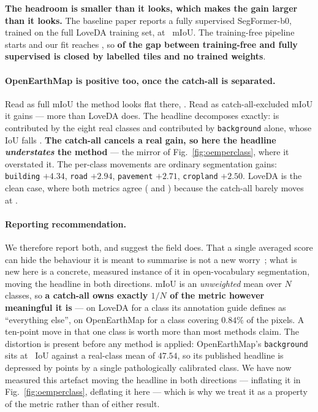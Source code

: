 \documentclass[10pt,a4paper]{article}                        %
\newcommand{\best}[1]{\textbf{#1}}
\newcommand{\bg}{\texttt{background}}
\begin{document}
\best{The headroom is smaller than it looks, which makes the gain larger than it
looks.} The baseline paper reports a fully supervised SegFormer-b0, trained on the
full LoveDA training set, at \oracleSup{}~mIoU. The training-free pipeline starts
\loveInstr{} and our fit reaches \eeFit{}, so \best{\gapClosed{} of the gap between
training-free and fully supervised is closed by \calibTiles{} labelled tiles and no
trained weights}.

\paragraph{OpenEarthMap is positive too, once the catch-all is separated.} Read
as full mIoU the method looks flat there, \mrOemFull{}. Read as
catch-all-excluded mIoU it gains \best{\mrOemReal{}} --- more than LoveDA does.
The headline decomposes exactly: \mrOemFull{} is \mrOemLand{} contributed by the
eight real classes and \mrOemBgC{} contributed by \bg{} alone, whose IoU falls
\mrOemBg{}. \best{The catch-all cancels a real gain, so here the headline
\emph{understates} the method} --- the mirror of Fig.~\ref{fig:oemperclass},
where it overstated it. The per-class movements are ordinary segmentation gains:
\texttt{building} $+4.34$, \texttt{road} $+2.94$, \texttt{pavement} $+2.71$,
\texttt{cropland} $+2.50$. LoveDA is the clean case, where both metrics agree
(\mrLoveFull{} and \mrLoveReal{}) because the catch-all barely moves at
\mrLoveBg{}.

\paragraph{Reporting recommendation.} We therefore report both, and suggest the
field does. That a single averaged score can hide the behaviour it is meant to
summarise is not a new worry~\cite{evalmeasure}; what is new here is a concrete,
measured instance of it in open-vocabulary segmentation, moving the headline in
both directions. mIoU is an \emph{unweighted} mean over $N$ classes, so \best{a
catch-all owns exactly $1/N$ of the metric however meaningful it is} ---
\mrLoveLever{} on LoveDA for a class its annotation guide defines as ``everything
else'', \mrOemLever{} on OpenEarthMap for a class covering $0.84\%$ of the pixels.
A ten-point move in that one class is worth more than most methods claim. The
distortion is present before any method is applied: OpenEarthMap's \bg{} sits at
\mrOemBgIoU{}~IoU against a real-class mean of $47.54$, so its published headline
is depressed by \mrOemDistort{} points by a single pathologically calibrated
class. We have now measured this artefact moving the headline in both directions
--- inflating it in Fig.~\ref{fig:oemperclass}, deflating it here --- which is
why we treat it as a property of the metric rather than of either result.
\end{document}
